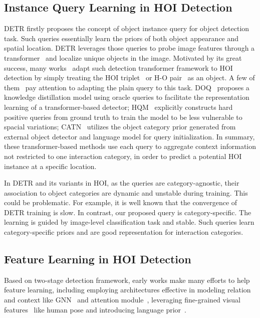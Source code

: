 \documentclass[10pt,twocolumn,letterpaper]{article}
\begin{document}
\subsection{Instance Query Learning in HOI Detection}
DETR\cite{carion2020end} firstly proposes the concept of object instance query for object detection task. Such queries essentially learn the priors of both object appearance and spatial location. DETR leverages those queries to probe image features through a transformer~\cite{vaswani2017attention} and localize unique objects in the image. Motivated by its great success, many works~\cite{tamura2021qpic, zou2021end,kim2021hotr,zhang2021mining,liao2022gen,zhou2022disentangled} adapt such detection transformer framework to HOI detection by simply treating the HOI triplet~\cite{tamura2021qpic, zou2021end} or H-O pair~\cite{kim2021hotr, chen2021reformulating} as an object. A few of them~\cite{qu2022distillation, dong2022catn, zhong2022hardquerymining} pay attention to adapting the plain query to this task. DOQ~\cite{qu2022distillation} proposes a knowledge distillation model using oracle queries to facilitate the representation learning of a transformer-based detector; HQM~\cite{zhong2022hardquerymining} explicitly constructs hard positive queries from ground truth to train the model to be less vulnerable to spacial variations; CATN~\cite{dong2022catn} utilizes the object category prior generated from external object detector and language model for query initialization. In summary, these transformer-based methods use each query to aggregate context information not restricted to one interaction category, in order to predict a potential HOI instance at a specific location.



In DETR\cite{carion2020end} and its variants\cite{tamura2021qpic, zou2021end, kim2021hotr, chen2021reformulating, zhang2021mining, liao2022gen} in HOI, as the queries are category-agnostic, their association to object categories are dynamic and unstable during training. This could be problematic. For example, it is well known that the convergence of DETR training is slow. 
In contrast, our proposed query is category-specific. The learning is guided by image-level classification task and stable. Such queries learn category-specific priors and are good representation for interaction categories. 


\subsection{Feature Learning in HOI Detection}
Based on two-stage detection framework, early works make many efforts to help feature learning, including employing architectures effective in modeling relation and context like GNN~\cite{qi2018learning, ulutan2020vsgnet, wang2020contextual, gao2020drg} and attention module~\cite{gao2018ican, ulutan2020vsgnet, zhong2021polysemy}, leveraging fine-grained visual features~\cite{li2019transferable, gupta2019nofrills, kim2020detecting, li2020pastanet, wan2019pose} like human pose and introducing language prior~\cite{zhong2021polysemy, bansal2020functional, liu2020amplifying, kim2020detecting, gao2020drg}.
\end{document}
